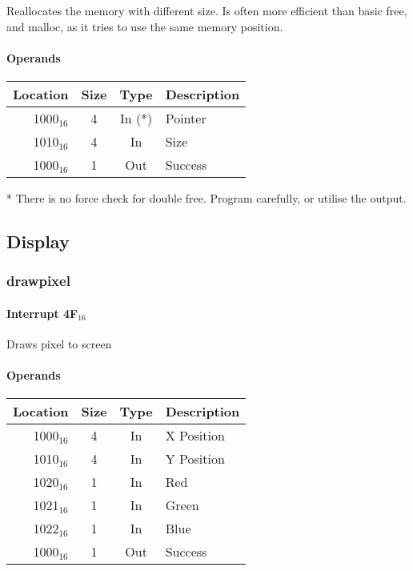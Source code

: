 \documentclass{article}
\begin{document}
Reallocates the memory with different size.
Is often more efficient than basic free, and malloc, as it
tries to use the same memory position.

\paragraph{Operands}

\begin{tabular}{|r|c|c|l|}
	\hline
	\textbf{Location} & \textbf{Size} & \textbf{Type} & \textbf{Description} \\
	\hline
	1000$_{16}$ & 4 & In (*) & Pointer \\
	\hline
	1010$_{16}$ & 4 & In & Size \\
	\hline
	1000$_{16}$ & 1 & Out & Success \\
	\hline
\end{tabular}

* There is no force check for double free. Program carefully, or utilise the output.

\subsection{Display}

\subsubsection{drawpixel}

\paragraph{Interrupt 4F$_{16}$}

Draws pixel to screen

\paragraph{Operands}

\begin{tabular}{|r|c|c|l|}
	\hline
	\textbf{Location} & \textbf{Size} & \textbf{Type} & \textbf{Description} \\
	\hline
	1000$_{16}$ & 4 & In & X Position \\
	\hline
	1010$_{16}$ & 4 & In & Y Position \\
	\hline
	1020$_{16}$ & 1 & In & Red \\
	\hline
	1021$_{16}$ & 1 & In & Green \\
	\hline
	1022$_{16}$ & 1 & In & Blue \\
	\hline
	1000$_{16}$ & 1 & Out & Success \\
	\hline
\end{tabular}
\end{document}
